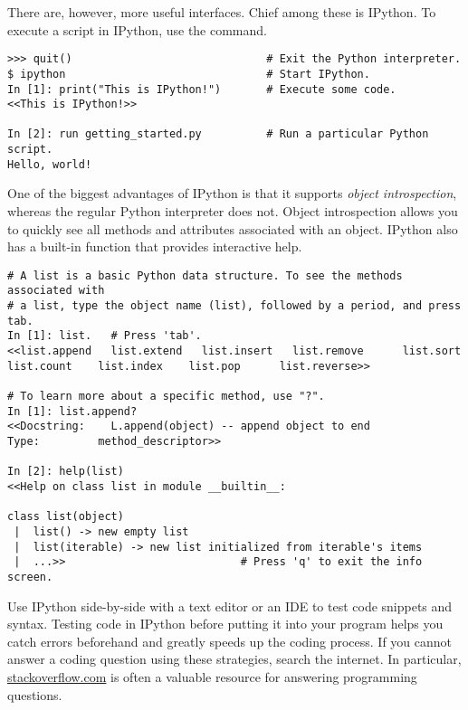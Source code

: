 There are, however, more useful interfaces.
Chief among these is IPython.
To execute a script in IPython, use the  command.

\begin{lstlisting}
>>> quit()                              # Exit the Python interpreter.
$ ipython                               # Start IPython.
In [1]: print("This is IPython!")       # Execute some code.
<<This is IPython!>>

In [2]: run getting_started.py          # Run a particular Python script.
Hello, world!
\end{lstlisting}

One of the biggest advantages of IPython is that it supports \emph{object introspection}, whereas the regular Python interpreter does not.
Object introspection allows you to quickly see all methods and attributes associated with an object.
IPython also has a built-in  function that provides interactive help.

\begin{lstlisting}
# A list is a basic Python data structure. To see the methods associated with
# a list, type the object name (list), followed by a period, and press tab.
In [1]: list.   # Press 'tab'.
<<list.append   list.extend   list.insert   list.remove      list.sort
list.count    list.index    list.pop      list.reverse>>

# To learn more about a specific method, use "?".
In [1]: list.append?
<<Docstring:    L.append(object) -- append object to end
Type:         method_descriptor>>

In [2]: help(list)
<<Help on class list in module __builtin__:

class list(object)
 |  list() -> new empty list
 |  list(iterable) -> new list initialized from iterable's items
 |  ...>>                           # Press 'q' to exit the info screen.
\end{lstlisting}

Use IPython side-by-side with a text editor or an IDE to test code snippets and syntax.
Testing code in IPython before putting it into your program helps you catch errors beforehand and greatly speeds up the coding process.
If you cannot answer a coding question using these strategies, search the internet.
In particular, \href{http://stackoverflow.com/}{stackoverflow.com} is often a valuable resource for answering programming questions.


